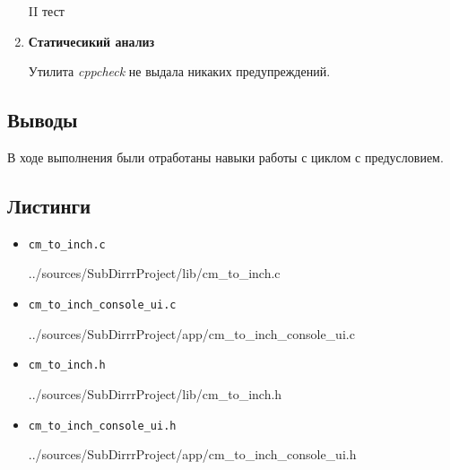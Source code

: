 \documentclass[12pt,a4paper]{report}
\begin{document}
\begin{enumerate}
\begin{description}
\item[II тест]
\hspace{\parindent}
\begin{flushleft}
\end{flushleft}
\end{description}
\item \textbf{Статичесикий анализ}

\hspace{\parindent} 
Утилита \textit{cppcheck} не выдала никаких предупреждений.
\end{enumerate}

\subsection{Выводы}
\hspace{\parindent}
В ходе выполнения были отработаны навыки работы с циклом с предусловием. 

\subsection*{Листинги}
\begin{itemize}
\item[] \verb-cm_to_inch.c-

{../sources/SubDirrrProject/lib/cm_to_inch.c}
\item[] \verb-cm_to_inch_console_ui.c-

{../sources/SubDirrrProject/app/cm_to_inch_console_ui.c}
\item[] \verb-cm_to_inch.h-

{../sources/SubDirrrProject/lib/cm_to_inch.h}
\item[] \verb-cm_to_inch_console_ui.h-

{../sources/SubDirrrProject/app/cm_to_inch_console_ui.h}
\end{itemize}
\end{document}
